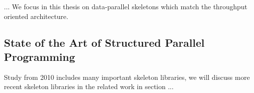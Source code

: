... We focus in this thesis on data-parallel skeletons which match the throughput oriented \GPU architecture.

\subsection{State of the Art of Structured Parallel Programming}



  Study from 2010 includes many important skeleton libraries, we will discuss more recent skeleton libraries in the related work in section ...


%
%
%
